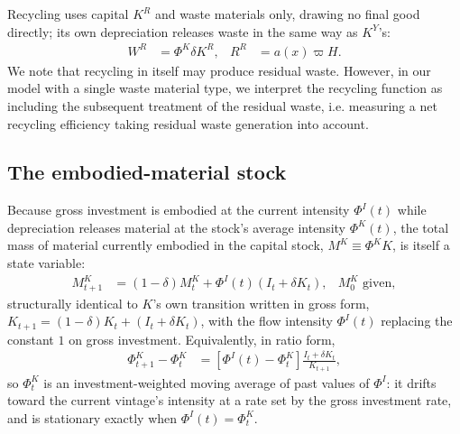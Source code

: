  Recycling uses capital $K^R$ and waste materials only, drawing no final good directly; its own depreciation releases waste in the same way as $K^Y$'s:
\begin{align}
W^R &= \Phi^K\delta K^R, & R^R &= a\!\left(x\right)\varpi H.
\label{eq:sp:setup:recycling-mass}
\end{align}
We note that recycling in itself may produce residual waste. However, in our model with a single waste material type, we interpret the recycling function as including the subsequent treatment of the residual waste, i.e. measuring a net recycling efficiency taking residual waste generation into account. 

\subsection{The embodied-material stock}
\label{sec:sp:setup:embodied-stock}
Because gross investment is embodied at the current intensity $\Phi^I(t)$ while depreciation releases material at the stock's average intensity $\Phi^K(t)$, the total mass of material currently embodied in the capital stock, $M^K\equiv\Phi^KK$, is itself a state variable:
\begin{align}
M^K_{t+1} &= \left(1-\delta\right)M^K_t+\Phi^I(t)\left(I_t+\delta K_t\right),
&
M^K_0 \text{ given},
\label{eq:sp:setup:Phi-motion}
\end{align}
structurally identical to $K$'s own transition written in gross form, $K_{t+1}=\left(1-\delta\right)K_t+\left(I_t+\delta K_t\right)$, with the flow intensity $\Phi^I(t)$ replacing the constant $1$ on gross investment. Equivalently, in ratio form,
\begin{align}
\Phi^K_{t+1}-\Phi^K_t &= \left[\Phi^I(t)-\Phi^K_t\right]\frac{I_t+\delta K_t}{K_{t+1}},
\label{eq:sp:setup:phiK-motion}
\end{align}
so $\Phi^K_t$ is an investment-weighted moving average of past values of $\Phi^I$: it drifts toward the current vintage's intensity at a rate set by the gross investment rate, and is stationary exactly when $\Phi^I(t)=\Phi^K_t$.



